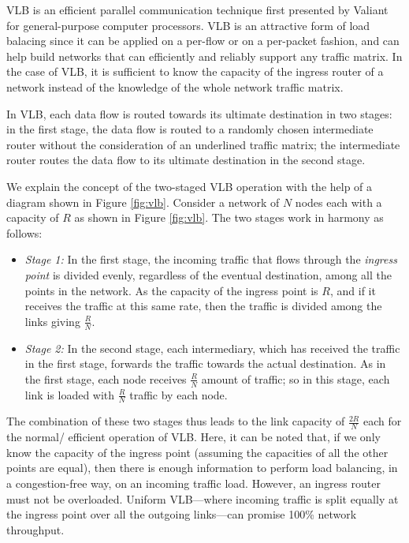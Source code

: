 \documentclass[10pt]{IEEEtran}
\begin{document}
VLB is an efficient parallel communication technique first presented by Valiant \cite{valiant1982scheme, valiant1981universal, Valiant1990} for general-purpose computer processors. VLB is an attractive form of load balacing since it can be applied on a per-flow or on a per-packet fashion, and can help build networks that can efficiently and reliably support any traffic matrix. In the case of VLB, it is sufficient to know the capacity of the ingress router of a network instead of the knowledge of the whole network traffic matrix. 

In VLB, each data flow is routed towards its ultimate destination in two stages: in the first stage, the data flow is routed to a randomly chosen intermediate router without the consideration of an underlined traffic matrix; the intermediate router routes the data flow to its ultimate destination in the second stage.

We explain the concept of the two-staged VLB operation with the help of a diagram shown in Figure \ref{fig:vlb}. Consider a network of $N$ nodes each with a capacity of $R$ as shown in Figure \ref{fig:vlb}. The two stages work in harmony as follows:

\begin{itemize}

\vspace{1mm}
\item{\textit{Stage 1:}} In the first stage, the incoming traffic that flows through the \textit{ingress point} is divided evenly, regardless of the eventual destination, among all the points in the network. As the capacity of the ingress point is $R$, and if it receives the traffic at this same rate, then the traffic is divided among the links giving $\frac{R}{N}$.

\vspace{1mm}
\item{\textit{Stage 2:}} In the second stage, each intermediary, which has received the traffic in the first stage, forwards the traffic towards the actual destination. As in the first stage, each node receives $\frac{R}{N}$ amount of traffic; so in this stage, each link is loaded with $\frac{R}{N}$ traffic by each node.

\end{itemize}

The combination of these two stages thus leads to the link capacity of $\frac{2R}{N}$ each for the normal/ efficient operation of VLB. Here, it can be noted that, if we only know the capacity of the ingress point (assuming the capacities of all the other points are equal), then there is enough information to perform load balancing, in a congestion-free way, on an incoming traffic load. However, an ingress router must not be overloaded. Uniform VLB---where incoming traffic is split equally at the ingress point over all the outgoing links---can promise 100\% network throughput. 
\end{document}
